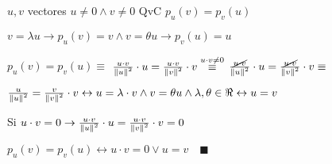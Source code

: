 \documentclass[../practica_01.tex]{subfiles}
\begin{document}
$u, v$ vectores $u \neq 0 \wedge v \neq 0$ QvC $p_u(v) = p_v(u)$

$ v = \lambda u \rightarrow p_u(v) = v \wedge v = \theta u \rightarrow p_v(u) = u$

$ p_u(v) = p_v(u) \equiv $
$ \frac{u \cdot v}{\norm*{u}^2}\cdot u = \frac{u \cdot v}{\norm*{v}^2}\cdot v \stackrel{u\cdot v \neq 0}{\equiv} $
$ \frac{\cancel{u \cdot v}}{\norm*{u}^2}\cdot u = \frac{\cancel{u \cdot v}}{\norm*{v}^2}\cdot v \equiv$

$ \frac{u}{\norm*{u}^2} = \frac{v}{\norm*{v}^2}\cdot v \leftrightarrow u = \lambda \cdot v \wedge v = \theta u \wedge \lambda,\theta \in \real \leftrightarrow u = v$

Si $ u\cdot v = 0 \rightarrow \frac{u \cdot v}{\norm*{u}^2}\cdot u = \frac{u \cdot v}{\norm*{v}^2}\cdot v = 0$

$ p_u(v) = p_v(u) \leftrightarrow u \cdot v = 0 \vee u = v \quad \blacksquare$
\end{document}
